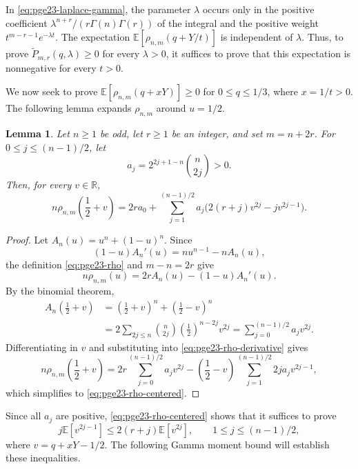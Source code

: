 \documentclass[11pt]{article}
\newtheorem{lemma}[theorem]{Lemma}
\theoremstyle{remark}
\numberwithin{equation}{section}
\newcommand{\R}{\mathbb R}
\newcommand{\E}{\mathbb E}
\begin{document}
In \eqref{eq:pge23-laplace-gamma}, the parameter $\lambda$ occurs only in
the positive coefficient $\lambda^{n+r}/(r\Gamma(n)\Gamma(r))$ of the integral
and the positive weight
$t^{m-r-1}e^{-\lambda t}$. The expectation
$\E\left[\rho_{n,m}(q+Y/t)\right]$ is independent of $\lambda$.
Thus, to prove $\widetilde P_{m,r}(q,\lambda)\ge0$ for every $\lambda>0$,
it suffices to prove that this expectation is nonnegative for every $t>0$.

We now seek to prove $\E\left[\rho_{n,m}(q+xY)\right]\ge0$ for $0\le q\le1/3$,
where $x=1/t>0$. The following lemma expands $\rho_{n,m}$ around $u=1/2$.

\begin{lemma}\label{lem:pge23-rho-centered}
  Let $n\ge1$ be odd, let $r\ge1$ be an integer, and set $m=n+2r$.
  For $0\le j\le(n-1)/2$, let
  \[
    a_j=2^{2j+1-n}\binom n{2j}>0.
  \]
  Then, for every $v\in\R$,
  \begin{equation}\label{eq:pge23-rho-centered}
    n\rho_{n,m}\left(\frac12+v\right)
    =2ra_0+\sum_{j=1}^{(n-1)/2}
    a_j\bigl(2(r+j)v^{2j}-jv^{2j-1}\bigr).
  \end{equation}
\end{lemma}

\begin{proof}
  Let $A_n(u)=u^n+(1-u)^n$. Since
  \[
    (1-u)A_n'(u)=nu^{n-1}-nA_n(u),
  \]
  the definition \eqref{eq:pge23-rho} and $m-n=2r$ give
  \begin{equation}\label{eq:pge23-rho-derivative}
    n\rho_{n,m}(u)=2rA_n(u)-(1-u)A_n'(u).
  \end{equation}
  By the binomial theorem,
  \begin{align*}
    A_n\left(\frac12+v\right)
    &=\left(\frac12+v\right)^n+\left(\frac12-v\right)^n\\
    &=2\sum_{2j\le n}\binom n{2j}\left(\frac12\right)^{n-2j}v^{2j}
      =\sum_{j=0}^{(n-1)/2}a_jv^{2j}.
  \end{align*}
  Differentiating in $v$ and substituting into
  \eqref{eq:pge23-rho-derivative} gives
  \[
    n\rho_{n,m}\left(\frac12+v\right)
    =2r\sum_{j=0}^{(n-1)/2}a_jv^{2j}
    -\left(\frac12-v\right)
      \sum_{j=1}^{(n-1)/2}2ja_jv^{2j-1},
  \]
  which simplifies to \eqref{eq:pge23-rho-centered}.
\end{proof}

Since all $a_j$ are positive, \eqref{eq:pge23-rho-centered} shows that it
suffices to prove
\[
  j\E\left[v^{2j-1}\right]\le2(r+j)\E\left[v^{2j}\right],
  \qquad 1\le j\le(n-1)/2,
\]
where $v=q+xY-1/2$. The following Gamma moment bound will establish these
inequalities.
\end{document}
